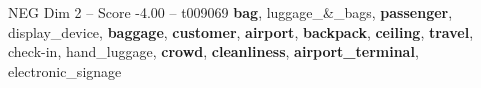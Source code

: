 \begin{textsample}{NEG Dim 2 – Score -4.00 – t009069}  \label{ex:f2_neg_010}
\textbf{bag}, luggage\_\&\_bags, \textbf{passenger}, display\_device, \textbf{baggage}, \textbf{customer}, \textbf{airport}, \textbf{backpack}, \textbf{ceiling}, \textbf{travel}, check-in, hand\_luggage, \textbf{crowd}, \textbf{cleanliness}, \textbf{airport\_terminal}, electronic\_signage

\end{textsample}
